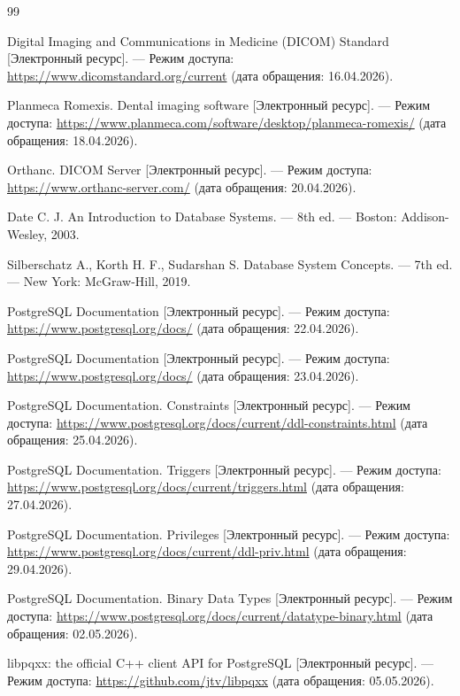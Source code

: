 \begin{thebibliography}{99}
	
	Digital Imaging and Communications in Medicine (DICOM) Standard [Электронный ресурс]. — Режим доступа:
	\url{https://www.dicomstandard.org/current} (дата обращения: 16.04.2026).
	
	Planmeca Romexis. Dental imaging software [Электронный ресурс]. — Режим доступа:
	\url{https://www.planmeca.com/software/desktop/planmeca-romexis/} (дата обращения: 18.04.2026).
	
	Orthanc. DICOM Server [Электронный ресурс]. — Режим доступа:
	\url{https://www.orthanc-server.com/} (дата обращения: 20.04.2026).
	
	Date C. J. An Introduction to Database Systems. — 8th ed. — Boston: Addison-Wesley, 2003.
	
	Silberschatz A., Korth H. F., Sudarshan S. Database System Concepts. — 7th ed. — New York: McGraw-Hill, 2019.
	
	PostgreSQL Documentation [Электронный ресурс]. — Режим доступа:
	\url{https://www.postgresql.org/docs/} (дата обращения: 22.04.2026).
	
	PostgreSQL Documentation [Электронный ресурс]. — Режим доступа:
	\url{https://www.postgresql.org/docs/} (дата обращения: 23.04.2026).
	
	PostgreSQL Documentation. Constraints [Электронный ресурс]. — Режим доступа:
	\url{https://www.postgresql.org/docs/current/ddl-constraints.html} (дата обращения: 25.04.2026).
	
	PostgreSQL Documentation. Triggers [Электронный ресурс]. — Режим доступа:
	\url{https://www.postgresql.org/docs/current/triggers.html} (дата обращения: 27.04.2026).
	
	PostgreSQL Documentation. Privileges [Электронный ресурс]. — Режим доступа:
	\url{https://www.postgresql.org/docs/current/ddl-priv.html} (дата обращения: 29.04.2026).
	
	PostgreSQL Documentation. Binary Data Types [Электронный ресурс]. — Режим доступа:
	\url{https://www.postgresql.org/docs/current/datatype-binary.html} (дата обращения: 02.05.2026).
	
	libpqxx: the official C++ client API for PostgreSQL [Электронный ресурс]. — Режим доступа:
	\url{https://github.com/jtv/libpqxx} (дата обращения: 05.05.2026).
	

\end{thebibliography}

